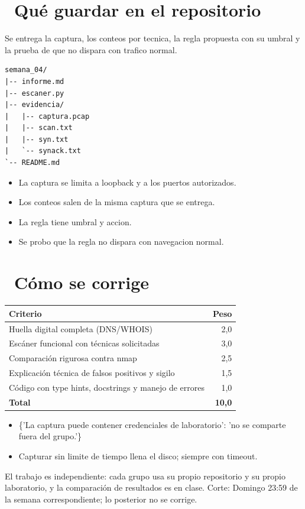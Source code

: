 \documentclass[11pt,a4paper]{article}
\newcommand{\iconotexto}[2]{\textcolor{cyanNeon}{\faIcon{#1}}~#2}
\begin{document}
\section{\iconotexto{box-open}{Qué guardar en el repositorio}}

Se entrega la captura, los conteos por tecnica, la regla propuesta con su umbral y la prueba de que no dispara con trafico normal.

\begin{lstlisting}[style=estiloCodigo]
semana_04/
|-- informe.md
|-- escaner.py
|-- evidencia/
|   |-- captura.pcap
|   |-- scan.txt
|   |-- syn.txt
|   `-- synack.txt
`-- README.md
\end{lstlisting}

\begin{itemize}[leftmargin=1.4em,itemsep=2pt,topsep=3pt]
  \item La captura se limita a loopback y a los puertos autorizados.
  \item Los conteos salen de la misma captura que se entrega.
  \item La regla tiene umbral y accion.
  \item Se probo que la regla no dispara con navegacion normal.
\end{itemize}

\section{\iconotexto{ruler-combined}{Cómo se corrige}}

\begin{tabularx}{\linewidth}{@{}X r@{}}
\toprule
Criterio & Peso\\
\midrule
Huella digital completa (DNS/WHOIS) & 2,0 \\
Escáner funcional con técnicas solicitadas & 3,0 \\
Comparación rigurosa contra nmap & 2,5 \\
Explicación técnica de falsos positivos y sigilo & 1,5 \\
Código con type hints, docstrings y manejo de errores & 1,0 \\
\midrule
\textbf{Total} & \textbf{10,0}\\
\bottomrule
\end{tabularx}

\begin{itemize}[leftmargin=1.4em,itemsep=2pt,topsep=3pt]
  \item \{'La captura puede contener credenciales de laboratorio': 'no se comparte fuera del grupo.'\}
  \item Capturar sin limite de tiempo llena el disco; siempre con timeout.
\end{itemize}

\begin{cajaRecuerda}El trabajo es independiente: cada grupo usa su propio repositorio y su propio laboratorio, y la comparación de resultados es en clase. Corte: Domingo 23:59 de la semana correspondiente; lo posterior no se corrige.
\end{cajaRecuerda}
\end{document}
